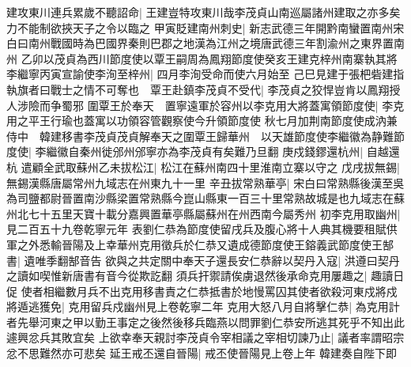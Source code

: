 建攻東川連兵累歲不聽詔命|{
	王建豈特攻東川哉李茂貞山南巡屬諸州建取之亦多矣力不能制欲挾天子之令以臨之}
甲寅貶建南州刺史|{
	新志武德三年開黔南蠻置南州宋白曰南州戰國時為巴國界秦則巴郡之地漢為江州之境唐武德三年割渝州之東界置南州}
乙卯以茂貞為西川節度使以覃王嗣周為鳳翔節度使癸亥王建克梓州南寨執其將李繼寧丙寅宣諭使李洵至梓州|{
	四月李洵受命而使六月始至}
己巳見建于張杷砦建指執旗者曰戰士之情不可奪也　覃王赴鎮李茂貞不受代|{
	李茂貞之狡悍豈肯以鳳翔授人涉險而争蜀邪}
圍覃王於奉天　置寧遠軍於容州以李克用大將蓋寓領節度使|{
	李克用之平王行瑜也蓋寓以功領容管觀察使今升領節度使}
秋七月加荆南節度使成汭兼侍中　韓建移書李茂貞茂貞解奉天之圍覃王歸華州　以天雄節度使李繼徽為静難節度使|{
	李繼徽自秦州徙邠州邠寧亦為李茂貞有矣難乃旦翻}
庚戍錢鏐還杭州|{
	自越還杭}
遣顧全武取蘇州乙未拔松江|{
	松江在蘇州南四十里淮南立寨以守之}
戊戌拔無錫|{
	無錫漢縣唐屬常州九域志在州東九十一里}
辛丑拔常熟華亭|{
	宋白曰常熟縣後漢至吳為司鹽都尉晉置南沙縣梁置常熟縣今崑山縣東一百三十里常熟故城是也九域志在蘇州北七十五里天寶十載分嘉興置華亭縣屬蘇州在州西南今屬秀州}
初李克用取幽州|{
	見二百五十九卷乾寧元年}
表劉仁恭為節度使留戌兵及腹心將十人典其機要租賦供軍之外悉輸晉陽及上幸華州克用徵兵於仁恭又遺成德節度使王鎔義武節度使王郜書|{
	遺唯季翻郜音告}
欲與之共定關中奉天子還長安仁恭辭以契丹入寇|{
	洪遵曰契丹之讀如喫惟新唐書有音今從欺訖翻}
須兵扞禦請俟虜退然後承命克用屢趣之|{
	趣讀日促}
使者相繼數月兵不出克用移書責之仁恭抵書於地慢罵囚其使者欲殺河東戍將戍將遁逃獲免|{
	克用留兵戍幽州見上卷乾寧二年}
克用大怒八月自將擊仁恭|{
	為克用計者先舉河東之甲以勤王事定之後然後移兵臨燕以問罪劉仁恭安所逃其死乎不知出此遽興忿兵其敗宜矣}
上欲幸奉天親討李茂貞令宰相議之宰相切諫乃止|{
	議者率謂昭宗忿不思難然亦可悲矣}
延王戒丕還自晉陽|{
	戒丕使晉陽見上卷上年}
韓建奏自陛下即

